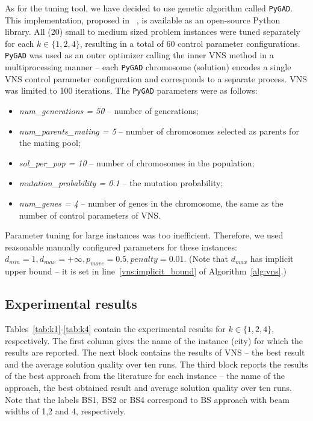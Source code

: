 \documentclass[dvipsnames,format=sigconf,anonymous=true,review=true]{acmart}
\begin{document}
   As for the tuning tool, we have decided to use genetic algorithm called \texttt{PyGAD}. This implementation, proposed in ~\cite{gad2021pygad}, is available as an open-source Python library. All (20) small to medium sized problem instances were tuned separately  for each $k\in \{1, 2, 4\}$, resulting in a total of 60 control parameter configurations. 
    \texttt{PyGAD} was used as an outer optimizer calling the inner VNS method in a multiprocessing manner -- each \texttt{PyGAD} chromosome (solution) encodes a single VNS control parameter configuration and corresponds to a separate process. VNS was limited to 100 iterations. The \texttt{PyGAD} parameters were as follows:
\begin{itemize}
	\item \emph{num\_generations = 50} -- number of generations;
	\item \emph{num\_parents\_mating = 5} -- number of chromosomes selected as parents for the mating pool;
	\item \emph{sol\_per\_pop = 10} -- number of chromosomes in the population;
	\item \emph{mutation\_probability = 0.1}  -- the mutation probability;
	\item \emph{num\_genes = 4} -- number of genes in the chromosome, the same as the number of control parameters of VNS. 
\end{itemize}
  
     
 Parameter tuning for large instances was too inefficient. Therefore, we used reasonable manually configured parameters for these instances: $d_{min}=1, d_{max} = + \infty, p_{move}=0.5, penalty = 0.01$. (Note that $d_{max}$ has implicit upper bound -- it is set in line~\ref{vns:implicit_bound} of Algorithm~\ref{alg:vns}.)

\subsection{Experimental results }
 Tables~\ref{tab:k1}-\ref{tab:k4} contain the experimental results for $k \in \{1, 2,4\}$, respectively. The first column gives the name of the instance (city) for which the results are reported. The next block contains the results of VNS -- the best result and the average solution quality over ten runs. The third block reports the results of the best approach from the literature for each instance -- the name of the approach, the best obtained result and average solution quality over ten runs. Note that the labels BS1, BS2 or BS4 correspond to BS approach with beam widths of 1,2 and 4, respectively. 
 
\end{document}
